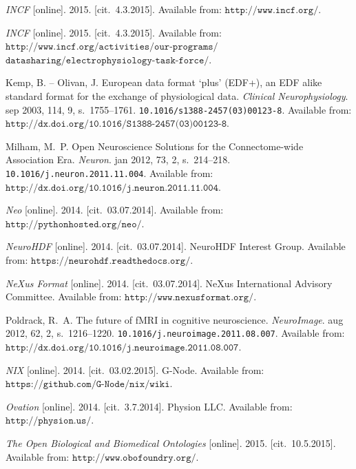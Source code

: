 \documentclass[conference]{IEEEtran}
\begin{document}
\begin{thebibliography}{1}
\emph{INCF} [online]. 2015. [cit.~4.3.2015].
\newblock Available from: $\texttt{{http://www.incf.org/}}$.

\emph{INCF} [online]. 2015. [cit.~4.3.2015].
\newblock Available from: $\texttt{{http://www.incf.org/activities/our-programs/}}$
$\texttt{{datasharing/electrophysiology-task-force/}}$.



{\sc Kemp}, B. -- {\sc Olivan}, J.
\newblock European data format `plus' (EDF+), an {EDF} alike standard format
for the exchange of physiological data.
\newblock \emph{Clinical Neurophysiology}. sep 2003, 114, 9, s.~1755--1761.
\newblock \texttt{10.1016/s1388-2457(03)00123-8}.
\newblock Available from:
$\texttt{{http://dx.doi.org/10.1016/S1388-2457(03)00123-8}}$.




{\sc Milham}, M.~P.
\newblock Open Neuroscience Solutions for the Connectome-wide Association Era.
\newblock \emph{Neuron}. jan 2012, 73, 2, s.~214--218.
\newblock \texttt{10.1016/j.neuron.2011.11.004}.
\newblock Available from:
$\texttt{{http://dx.doi.org/10.1016/j.neuron.2011.11.004}}$.

\emph{Neo} [online]. 2014. [cit.~03.07.2014].
\newblock Available from: $\texttt{{http://pythonhosted.org/neo/}}$.

\emph{NeuroHDF} [online]. 2014. [cit.~03.07.2014]. NeuroHDF Interest Group.
\newblock Available from: $\texttt{{https://neurohdf.readthedocs.org/}}$.

\emph{NeXus Format} [online]. 2014. [cit.~03.07.2014]. NeXus International
Advisory Committee.
\newblock Available from: $\texttt{{http://www.nexusformat.org/}}$.




{\sc Poldrack}, R.~A.
\newblock The future of {fMRI} in cognitive neuroscience.
\newblock \emph{{NeuroImage}}. aug 2012, 62, 2, s.~1216--1220.
\newblock \texttt{10.1016/j.neuroimage.2011.08.007}.
\newblock Available from:
$\texttt{{http://dx.doi.org/10.1016/j.neuroimage.2011.08.007}}$.



\emph{NIX} [online]. 2014. [cit.~03.02.2015]. G-Node.
\newblock Available from: $\texttt{{https://github.com/G-Node/nix/wiki}}$.

\emph{Ovation} [online]. 2014. [cit.~3.7.2014]. Physion LLC.
\newblock Available from: $\texttt{{http://physion.us/}}$.


\emph{The Open Biological and Biomedical Ontologies} [online]. 2015.
[cit.~10.5.2015].
\newblock Available from: $\texttt{{http://www.obofoundry.org/}}$.
\end{thebibliography}




\end{document}
